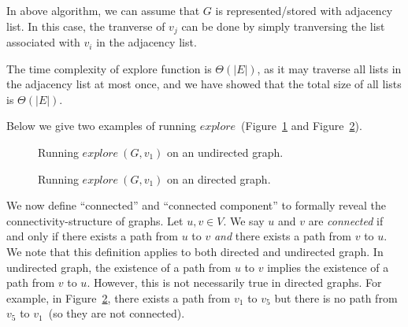 \begin{algorithmblock}[0.8\textwidth]
	\xxx
	\xxx
	\xxx
	\xxx
\end{algorithmblock}

In above algorithm, we can assume that $G$ is represented/stored with adjacency list.
In this case, the tranverse of $v_j$ can be done by simply tranversing the list associated with $v_i$
in the adjacency list. 

The time complexity of explore function is $\Theta(|E|)$, as it may traverse
all lists in the adjacency list at most once, and we have showed that 
the total size of all lists is $\Theta(|E|)$.


Below we give two examples of running $explore$~(Figure~\ref{fig:explore-undirected} and Figure~\ref{fig:explore-directed}). 

\begin{figure}[h!]
\centering{}
\caption{Running $explore~(G, v_1)$ on an undirected graph.}
\label{fig:explore-undirected}
\end{figure}

\begin{figure}[h!]
\centering{}
\caption{Running $explore~(G, v_1)$ on an directed graph.}
\label{fig:explore-directed}
\end{figure}

We now define ``connected'' and ``connected component'' to formally reveal the connectivity-structure of graphs.
Let $u,v\in V$. We say $u$ and $v$ are \emph{connected} if and only if there exists a path from $u$ to $v$
\emph{and} there exists a path from $v$ to $u$. 
We note that this definition applies to both directed and undirected graph.
In undirected graph, the existence of a path from $u$ to $v$ implies the
existence of a path from $v$ to $u$. However, this is not necessarily true in directed
graphs. For example, in Figure~\ref{fig:explore-directed}, there exists a path from $v_1$ to $v_5$ but there is no path
from $v_5$ to $v_1$~(so they are not connected).


